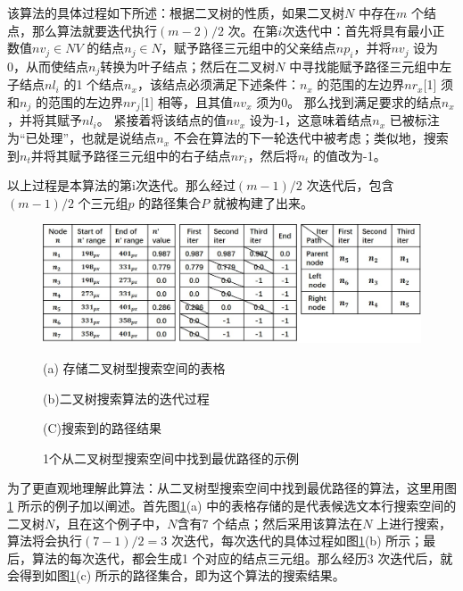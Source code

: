         该算法的具体过程如下所述：根据二叉树的性质，如果二叉树$N$ 中存在$m$ 个结点，那么算法就要迭代执行$(m-2)/2$ 次。在第$i$次迭代中：首先将具有最小正数值$nv_j \in NV$ 的结点$n_j \in N$，赋予路径三元组中的父亲结点$np_i$，并将$nv_j$ 设为0，从而使结点$n_j$转换为叶子结点；然后在二叉树$N$ 中寻找能赋予路径三元组中左子结点$nl_i$ 的1 个结点$n_x$，该结点必须满足下述条件：$n_x$ 的范围的左边界$nr_x$[1] 须和$n_j$ 的范围的左边界$nr_j$[1] 相等，且其值$nv_x$ 须为0。 那么找到满足要求的结点$n_x$，并将其赋予$nl_i$。 紧接着将该结点的值$nv_x$ 设为-1，这意味着结点$n_x$ 已被标注为``已处理''，也就是说结点$n_x$ 不会在算法的下一轮迭代中被考虑；类似地，搜索到$n_t$并将其赋予路径三元组中的右子结点$nr_i$，然后将$n_t$ 的值改为-1。

        以上过程是本算法的第i次迭代。那么经过$(m-1)/2$ 次迭代后，包含$(m-1)/2$ 个三元组$p$ 的路径集合$P$ 就被构建了出来。

        \begin{figure}[!h]
        \centering
        \includegraphics[width=\textwidth]{./figures/c4_bianry_tree_search.jpg}
        \begin{minipage}[t]{0.33\linewidth}
        \centerline{\small (a) 存储二叉树型搜索空间的表格}
        \end{minipage}
        \begin{minipage}[t]{0.33\linewidth}
        \centerline{\small(b)二叉树搜索算法的迭代过程}
        \end{minipage}
        \begin{minipage}[t]{0.26\linewidth}
        \centerline{\small(C)搜索到的路径结果}
        \end{minipage}
        \caption{1个从二叉树型搜索空间中找到最优路径的示例}
        \label{fig.c4_bianry_tree_search}
        \end{figure}

        为了更直观地理解此算法：从二叉树型搜索空间中找到最优路径的算法，这里用图\ref{fig.c4_bianry_tree_search} 所示的例子加以阐述。首先图\ref{fig.c4_bianry_tree_search}(a) 中的表格存储的是代表候选文本行搜索空间的二叉树$N$，且在这个例子中，$N$含有7 个结点；然后采用该算法在$N$ 上进行搜索，算法将会执行$(7-1)/2=3$ 次迭代，每次迭代的具体过程如图\ref{fig.c4_bianry_tree_search}(b) 所示；最后，算法的每次迭代，都会生成1 个对应的结点三元组。那么经历3 次迭代后，就会得到如图\ref{fig.c4_bianry_tree_search}(c) 所示的路径集合，即为这个算法的搜索结果。

